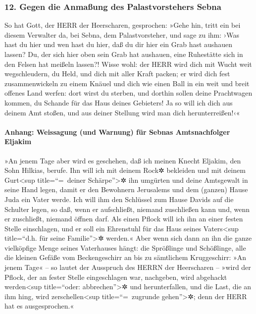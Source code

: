 \hypertarget{gegen-die-anmauxdfung-des-palastvorstehers-sebna}{%
\subsubsection{12. Gegen die Anmaßung des Palastvorstehers
Sebna}\label{gegen-die-anmauxdfung-des-palastvorstehers-sebna}}

So hat Gott, der HERR der Heerscharen, gesprochen: »Gehe
hin, tritt ein bei diesem Verwalter da, bei Sebna, dem Palastvorsteher,
und sage zu ihm: ›Was hast du hier und wen hast du hier,
daß du dir hier ein Grab hast aushauen lassen? Du, der sich hier oben
sein Grab hat aushauen, eine Ruhestätte sich in den Felsen hat meißeln
lassen?! Wisse wohl: der HERR wird dich mit Wucht weit
wegschleudern, du Held, und dich mit aller Kraft packen;
er wird dich fest zusammenwickeln zu einem Knäuel und
dich wie einen Ball in ein weit und breit offenes Land werfen: dort
wirst du sterben, und dorthin sollen deine Prachtwagen kommen, du
Schande für das Haus deines Gebieters! Ja so will ich
dich aus deinem Amt stoßen, und aus deiner Stellung wird man dich
herunterreißen!‹«

\hypertarget{anhang-weissagung-und-warnung-fuxfcr-sebnas-amtsnachfolger-eljakim}{%
\paragraph{Anhang: Weissagung (und Warnung) für Sebnas Amtsnachfolger
Eljakim}\label{anhang-weissagung-und-warnung-fuxfcr-sebnas-amtsnachfolger-eljakim}}

»An jenem Tage aber wird es geschehen, daß ich meinen
Knecht Eljakim, den Sohn Hilkias, berufe. Ihn will ich
mit deinem Rock✲ bekleiden und mit deinem Gurt\textless sup
title=``=~deiner Schärpe''\textgreater✲ ihn umgürten und deine
Amtsgewalt in seine Hand legen, damit er den Bewohnern Jerusalems und
dem (ganzen) Hause Juda ein Vater werde. Ich will ihm den
Schlüssel zum Hause Davids auf die Schulter legen, so daß, wenn er
aufschließt, niemand zuschließen kann und, wenn er zuschließt, niemand
öffnen darf. Als einen Pflock will ich ihn an einer
festen Stelle einschlagen, und er soll ein Ehrenstuhl für das Haus
seines Vaters\textless sup title=``d.h. für seine Familie''\textgreater✲
werden.« Aber wenn sich dann an ihn die ganze vielköpfige
Menge seines Vaterhauses hängt: die Sprößlinge und Schößlinge, alle die
kleinen Gefäße vom Beckengeschirr an bis zu sämtlichem Kruggeschirr:
»An jenem Tage« -- so lautet der Ausspruch des HERRN der
Heerscharen -- »wird der Pflock, der an fester Stelle eingeschlagen war,
nachgeben, wird abgehackt werden\textless sup title=``oder:
abbrechen''\textgreater✲ und herunterfallen, und die Last, die an ihm
hing, wird zerschellen\textless sup title=``=~zugrunde
gehen''\textgreater✲; denn der HERR hat es ausgesprochen.«

